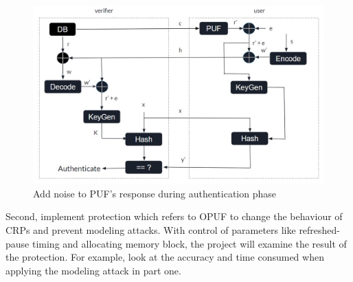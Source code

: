 \begin{figure}[htp]
    \centering
    \includegraphics[width=18cm]{figures/figure10.jpg}
    \caption{Add noise to PUF's response during authentication phase}
    \label{fig:figure10}
    \end{figure}

Second, implement protection which refers to OPUF to change the behaviour of CRPs and prevent modeling attacks. With control of parameters like refreshed-pause timing and allocating memory block, 
the project will examine the result of the protection. For example, look at the accuracy and time consumed when applying the modeling attack in part one.






